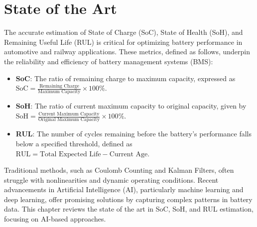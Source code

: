 




\chapter{State of the Art}
\label{ch:stateoftheart}
The accurate estimation of State of Charge (SoC), State of Health (SoH), and Remaining Useful Life (RUL) is critical for optimizing battery performance in automotive and railway applications. These metrics, defined as follows, underpin the reliability and efficiency of battery management systems (BMS):
\begin{itemize}
    \item \textbf{SoC}: The ratio of remaining charge to maximum capacity, expressed as \( \text{SoC} = \frac{\text{Remaining Charge}}{\text{Maximum Capacity}} \times 100\% \).
    \item \textbf{SoH}: The ratio of current maximum capacity to original capacity, given by \( \text{SoH} = \frac{\text{Current Maximum Capacity}}{\text{Original Maximum Capacity}} \times 100\% \).
    \item \textbf{RUL}: The number of cycles remaining before the battery's performance falls below a specified threshold, defined as \( \text{RUL} = \text{Total Expected Life} - \text{Current Age} \).
\end{itemize}
Traditional methods, such as Coulomb Counting and Kalman Filters, often struggle with nonlinearities and dynamic operating conditions. Recent advancements in Artificial Intelligence (AI), particularly machine learning and deep learning, offer promising solutions by capturing complex patterns in battery data. This chapter reviews the state of the art in SoC, SoH, and RUL estimation, focusing on AI-based approaches.

